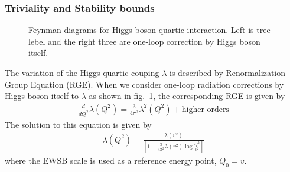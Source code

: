 \subsubsection{Triviality and Stability bounds}
\begin{figure}[t]
\centering
{}
\hspace{0.3cm}
 \hspace{0.3cm}
\hspace{0.3cm}
\caption{Feynman diagrams for Higgs boson quartic interaction. Left is tree lebel and 
the right three are one-loop correction by Higgs boson itself.} 
\label{fig:FD_triviality} 
\end{figure} 
The variation of the Higgs quartic couping $\lambda$ is described by 
Renormalization Group Equation (RGE). 
When we consider one-loop radiation corrections by Higgs boson itself 
to $\lambda$ as shown in fig.~\ref{fig:FD_triviality}, 
the corresponding RGE is given by \cite{Djouadi20081} 
\begin{eqnarray} 
\frac{d}{dQ^2} \lambda (Q^2) 
= 
\frac{3}{4\pi^2} \lambda^2(Q^2) + \textrm{higher orders} 
\end{eqnarray} 
The solution to this equation is given by 
\begin{eqnarray} 
\displaystyle  \lambda(Q^2) = \frac{\lambda(v^2)} {\left[\displaystyle   1 - \frac{3}{4\pi^2} \lambda(v^2) \log{\frac{Q^2}{v^2}}\right] } 
\end{eqnarray} 
where the EWSB scale is used as a reference energy point, $Q_0 = v$. 

